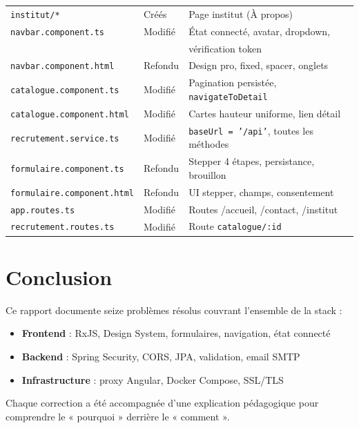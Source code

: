 \documentclass[a4paper,12pt,french]{article}
\begin{document}
\begin{center}
\begin{tabular}{|l|l|p{4.5cm}|}
\texttt{institut/*} & Créés & Page institut (À propos) \\
\texttt{navbar.component.ts} & Modifié & État connecté, avatar, dropdown, \\
& & vérification token \\
\texttt{navbar.component.html} & Refondu & Design pro, fixed, spacer, onglets \\
\texttt{catalogue.component.ts} & Modifié & Pagination persistée, \texttt{navigateToDetail} \\
\texttt{catalogue.component.html} & Modifié & Cartes hauteur uniforme, lien détail \\
\texttt{recrutement.service.ts} & Modifié & \texttt{baseUrl = '/api'}, toutes les méthodes \\
\texttt{formulaire.component.ts} & Refondu & Stepper 4 étapes, persistance, brouillon \\
\texttt{formulaire.component.html} & Refondu & UI stepper, champs, consentement \\
\texttt{app.routes.ts} & Modifié & Routes /accueil, /contact, /institut \\
\texttt{recrutement.routes.ts} & Modifié & Route \texttt{catalogue/:id} \\
\hline
\end{tabular}
\end{center}

\section{Conclusion}

Ce rapport documente seize problèmes résolus couvrant l'ensemble de la stack :
\begin{itemize}
    \item \textbf{Frontend} : RxJS, Design System, formulaires, navigation, état connecté
    \item \textbf{Backend} : Spring Security, CORS, JPA, validation, email SMTP
    \item \textbf{Infrastructure} : proxy Angular, Docker Compose, SSL/TLS
\end{itemize}

Chaque correction a été accompagnée d'une explication pédagogique pour comprendre le « pourquoi » derrière le « comment ».
\end{document}
